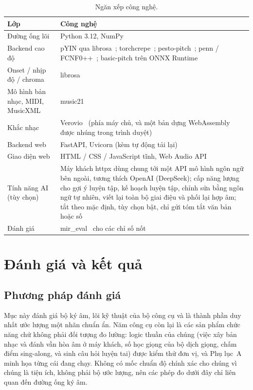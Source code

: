 \documentclass[12pt,a4paper]{article}
\begin{document}
\begin{table}[H]
\centering
\caption{Ngăn xếp công nghệ.}
\label{tab:stack}
\begin{tabular}{l p{}}
\toprule
\textbf{Lớp} & \textbf{Công nghệ} \\
\midrule
Đường ống lõi     & Python 3.12, NumPy \\
Backend cao độ    & pYIN qua librosa~\cite{librosa}; torchcrepe~\cite{crepe};
pesto-pitch~\cite{pesto}; penn / FCNF0++~\cite{penn}; basic-pitch trên ONNX
Runtime~\cite{basicpitch} \\
Onset / nhịp độ / chroma & librosa~\cite{librosa} \\
Mô hình bản nhạc, MIDI, MusicXML & music21~\cite{music21} \\
Khắc nhạc         & Verovio~\cite{verovio} (phía máy chủ, và một bản dựng
WebAssembly được nhúng trong trình duyệt) \\
Backend web       & FastAPI, Uvicorn (kèm tự động tải lại) \\
Giao diện web     & HTML / CSS / JavaScript tĩnh, Web Audio API \\
Tính năng AI (tùy chọn) & Máy khách httpx dùng chung tới một API mô hình ngôn ngữ
bên ngoài, tương thích OpenAI (DeepSeek); cấp năng lượng cho gợi ý luyện tập, kế
hoạch luyện tập, chỉnh sửa bằng ngôn ngữ tự nhiên, viết lại toàn bộ giai điệu và
phối lại hợp âm; tắt theo mặc định, tùy chọn bật, chỉ gửi tóm tắt văn bản hoặc số \\
Đánh giá          & mir\_eval~\cite{mireval} cho các chỉ số nốt \\
\bottomrule
\end{tabular}
\end{table}

\section{Đánh giá và kết quả}

\subsection{Phương pháp đánh giá}

Mục này đánh giá bộ ký âm, lõi kỹ thuật của bộ công cụ và là thành phần duy nhất ước
lượng một nhãn chuẩn ẩn. Năm công cụ còn lại là các sản phẩm chức năng chứ không
phải đối tượng đo lường: logic thuần của chúng (việc xây bản nhạc và đánh vần hòa âm
ở máy khách, số học giọng của bộ dịch giọng, chấm điểm sing-along, và sinh câu hỏi
luyện tai) được kiểm thử đơn vị, và Phụ lục~A minh họa từng cái đang chạy. Không có
mốc chuẩn độ chính xác cho chúng vì chúng là tiện ích, không phải bộ ước lượng, nên
các phép đo dưới đây chỉ liên quan đến đường ống ký âm.
\end{document}

